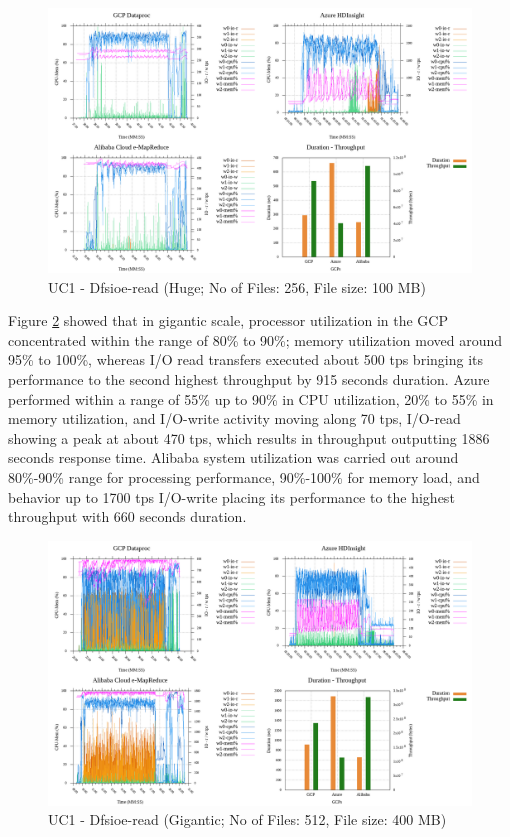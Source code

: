 \documentclass[review]{elsarticle}
\begin{document}
	\begin{figure}[p]
		\caption{UC1 - Dfsioe-read (Huge; No of Files: 256, File size: 100 MB)}
		\label{fig:uc1-dfsioer-h-cmidt}
		\includegraphics[width=\textwidth]{uc1-dfsioer-h-cmidt}
		\centering
	\end{figure}
	
	Figure \ref{fig:uc1-dfsioer-g-cmidt} showed that in gigantic scale, processor utilization in the GCP concentrated within the range of 80\% to 90\%; memory utilization moved around 95\% to 100\%, whereas I/O read transfers executed about 500 tps bringing its performance to the second highest throughput by 915 seconds duration. Azure performed within a range of 55\% up to 90\% in CPU utilization, 20\% to 55\% in memory utilization, and I/O-write activity moving along 70 tps, I/O-read showing a peak at about 470 tps, which results in throughput outputting 1886 seconds response time. Alibaba system utilization was carried out around 80\%-90\% range for processing performance, 90\%-100\% for memory load, and behavior up to 1700 tps I/O-write placing its performance to the highest throughput with 660 seconds duration.
	
	\begin{figure}[p]
		\caption{UC1 - Dfsioe-read (Gigantic; No of Files: 512, File size: 400 MB)}
		\label{fig:uc1-dfsioer-g-cmidt}
		\includegraphics[width=\textwidth]{uc1-dfsioer-g-cmidt}
		\centering
	\end{figure}
	
\end{document}
